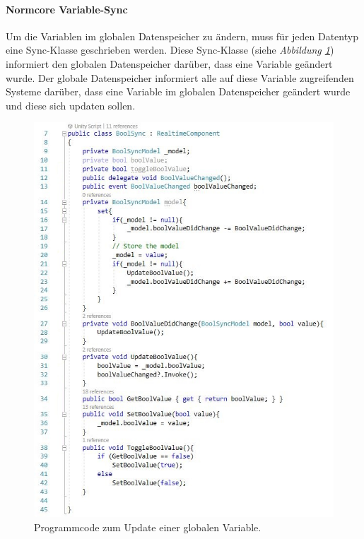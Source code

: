 \documentclass[a4paper,11pt]{article}%
\renewcommand{\\}{\vspace*{0.5\baselineskip} \newline}
\begin{document}
{\paragraph{Normcore Variable-Sync}
Um die Variablen im globalen Datenspeicher zu ändern, muss für jeden Datentyp eine Sync-Klasse geschrieben werden. Diese Sync-Klasse (siehe \textit{Abbildung \ref{boolSync}}) informiert den globalen Datenspeicher darüber, dass eine Variable geändert wurde. Der globale Datenspeicher informiert alle auf diese Variable zugreifenden Systeme darüber, dass eine Variable im globalen Datenspeicher geändert wurde und diese sich updaten sollen.

\begin{figure}[H]
		\begin{footnotesize}
			\includegraphics[scale=.75]{Abbildungen/boolValueChanged.jpg}
			\caption[Update von globalen Variablen]{Programmcode zum Update einer globalen Variable.}
			\label{boolSync}
		\end{footnotesize}
	\end{figure}

}
\end{document}

